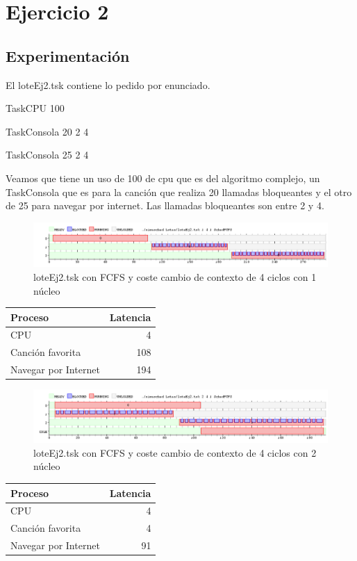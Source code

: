 
\section{Ejercicio 2}


\subsection{Experimentación}
El loteEj2.tsk contiene lo pedido por enunciado.

TaskCPU 100  

TaskConsola 20 2 4

TaskConsola 25 2 4

Veamos que tiene un uso de 100 de cpu que es del algoritmo complejo, un TaskConsola que es para la canción que realiza 20 llamadas bloqueantes y el otro de 25 para navegar por
internet. Las llamadas bloqueantes son entre 2 y 4.

\begin{figure}[H]
  \centering
    \includegraphics[width=1.1\textwidth]{imagenes/Ej2Experimento1core.png}
  \caption{loteEj2.tsk con FCFS y coste cambio de contexto de 4 ciclos con 1 núcleo}
\end{figure}

\begin{tabular}{l | r }
  Proceso & Latencia\\
  \hline
  CPU & 4\\
  Canción favorita & 108\\
  Navegar por Internet & 194\\
\end{tabular}

\begin{figure}[H]
  \centering
    \includegraphics[width=1.1\textwidth]{imagenes/Ej2Experimento2core.png}
  \caption{loteEj2.tsk con FCFS y coste cambio de contexto de 4 ciclos con 2 núcleo}
\end{figure}

\begin{tabular}{l | r }
  Proceso & Latencia\\
  \hline
  CPU & 4\\
  Canción favorita & 4\\
  Navegar por Internet & 91\\
\end{tabular}

